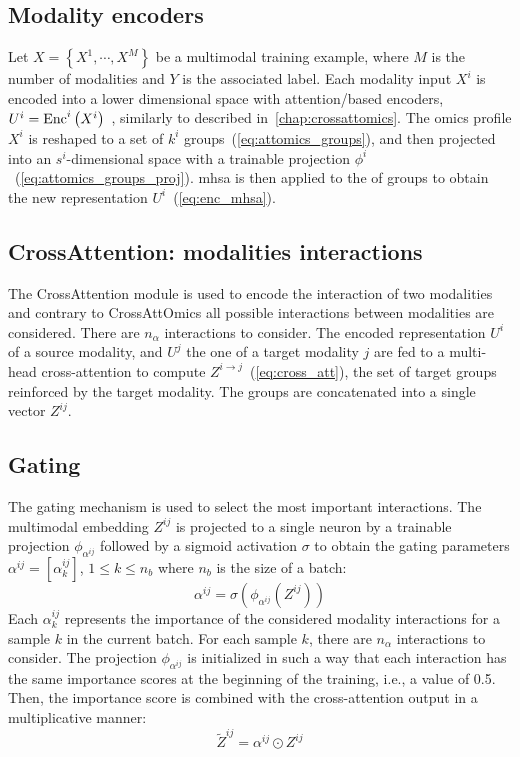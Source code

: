 \documentclass[../main.tex]{subfiles}
\begin{document}
	\subsection{Modality encoders}
		Let \( X = \left\{X^{1}, \cdots, X^{M} \right\} \) be a multimodal training example, where \(M\) is the number of modalities and \(Y\) is the associated label.
		Each modality input \(X^{i}\) is encoded into a lower dimensional space with attention\-/based encoders,\(U^{i} = \operatorname{Enc}^{i}\left(X^{i}\right)\)~\cite{AttOmics}, similarly to  described in~\cref{chap:crossattomics}.
		The omics profile \(X^{i}\) is reshaped to a set of \(k^i\) groups~(\cref{eq:attomics_groups}), and then projected into an \(s^i\)-dimensional space with a trainable projection \(\phi^i\)~(\cref{eq:attomics_groups_proj}).
		\Gls{mhsa} is then applied to the of groups to obtain the new representation \(U^{i}\)~(\cref{eq:enc_mhsa}).

	\subsection{CrossAttention: modalities interactions}
		The CrossAttention module is used to encode the interaction of two modalities and contrary to CrossAttOmics all possible interactions between modalities are considered.
		There are \(n_{\alpha}\) interactions to consider.
		The encoded representation \(U^{i}\) of a source modality, and \(U^{j}\) the one of a target modality \(j\) are fed to a multi-head cross-attention to compute \(Z^{i\rightarrow j}\)~(\cref{eq:cross_att}), the set of target groups reinforced by the target modality.
		The groups are concatenated into a single vector \(Z^{ij}\).

	\subsection{Gating}
		The gating mechanism is used to select the most important interactions.
		The multimodal embedding \(Z^{ij}\) is projected to a single neuron by a trainable projection \(\phi_{\alpha^{ij}}\) followed by a sigmoid activation \(\sigma\) to obtain the gating parameters \(\alpha^{ij} = \left[\alpha^{ij}_{k}\right]\), \(1 \leq k \leq n_b\) where \(n_b\) is the size of a batch:
		\begin{equation}
			\alpha^{ij} = \sigma \left( \phi_{\alpha^{ij}}\left( Z^{ij} \right)\right)
			\label{eq:gate_alpha}
		\end{equation}
		Each \(\alpha^{ij}_{k}\) represents the importance of the considered modality interactions for a sample \(k\) in the current batch.
		For each sample \(k\), there are \(n_{\alpha}\) interactions to consider.
		The projection \(\phi_{\alpha^{ij}}\) is initialized in such a way that each interaction has the same importance scores at the beginning of the training, i.e., a value of 0.5.
		Then, the importance score is combined with the cross-attention output in a multiplicative manner:
		\[ \tilde{Z}^{ij} = \alpha^{ij} \odot Z^{ij} \]
\end{document}
